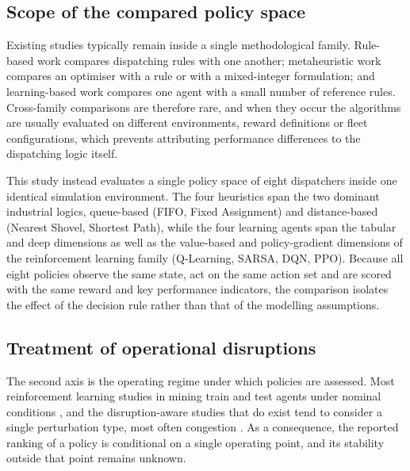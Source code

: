 \documentclass[11pt,a4paper]{article}
\begin{document}
\subsection{Scope of the compared policy space}

Existing studies typically remain inside a single methodological family. Rule-based work \cite{Alarie2002, Subtil2011, MehrnazMohtasham2023, NecmettinCetin2004} compares dispatching rules with one another; metaheuristic work \cite{Souza2010, GuangweiLiu2019, ShivPrakashUpadhyay2017, BurakOzdemir2019} compares an optimiser with a rule or with a mixed-integer formulation; and learning-based work \cite{deCarvalho2023, Zhao2025, Pei2025, FranciscoRosales2025} compares one agent with a small number of reference rules. Cross-family comparisons are therefore rare, and when they occur the algorithms are usually evaluated on different environments, reward definitions or fleet configurations, which prevents attributing performance differences to the dispatching logic itself.

This study instead evaluates a single policy space of eight dispatchers inside one identical simulation environment. The four heuristics span the two dominant industrial logics, queue-based (FIFO, Fixed Assignment) and distance-based (Nearest Shovel, Shortest Path), while the four learning agents span the tabular and deep dimensions as well as the value-based and policy-gradient dimensions of the reinforcement learning family (Q-Learning, SARSA, DQN, PPO). Because all eight policies observe the same state, act on the same action set and are scored with the same reward and key performance indicators, the comparison isolates the effect of the decision rule rather than that of the modelling assumptions.

\subsection{Treatment of operational disruptions}

The second axis is the operating regime under which policies are assessed. Most reinforcement learning studies in mining train and test agents under nominal conditions \cite{deCarvalho2023, Hazrathosseini2024, Zhao2025}, and the disruption-aware studies that do exist tend to consider a single perturbation type, most often congestion \cite{Zeng2022}. As a consequence, the reported ranking of a policy is conditional on a single operating point, and its stability outside that point remains unknown.
\end{document}
